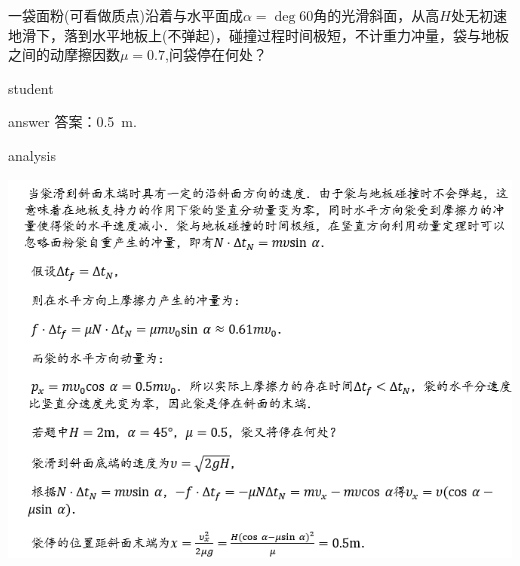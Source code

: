  \begin{example}
 	一袋面粉(可看做质点)沿着与水平面成$ \alpha = \deg{60} $角的光滑斜面，从高$ H $处无初速地滑下，落到水平地板上(不弹起)，碰撞过程时间极短，不计重力冲量，袋与地板之间的动摩擦因数$ \mu = 0.7 $,问袋停在何处？
 	
 	\begin{taggedblock}{student}
 		\vspace*{2cm}
 	\end{taggedblock}
 	
 	
 	\begin{taggedblock}{answer}
 		答案：0.5~\si{m}.
 	\end{taggedblock}
 	
 	
 	\begin{taggedblock}{analysis}
 	\begin{center}
\includegraphics[width=0.8\linewidth]{image/NIR-17}
\end{center}

 	\end{taggedblock}
 \end{example}
 
